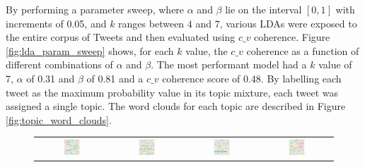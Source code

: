 By performing a parameter sweep, where $\alpha$ and $\beta$ lie on the interval
$[0, 1]$ with increments of 0.05, and $k$ ranges between $4$ and $7$, various
LDAs were exposed to the entire corpus of Tweets and then evaluated using $c\_v$
coherence. Figure \ref{fig:lda_param_sweep} shows, for each $k$ value, the $c\_v$ coherence as a
function of different combinations of $\alpha$ and $\beta$. The most performant
model had a $k$ value of 7, $\alpha$ of 0.31 and $\beta$ of 0.81 and a $c\_v$
coherence score of 0.48. By labelling each tweet as the maximum probability
value in its topic mixture, each tweet was assigned a single topic. The word
clouds for each topic are described in Figure \ref{fig:topic_word_clouds}.

\begin{figure}[h!]
    \centering
    \begin{tabular}{cccc}
    \includegraphics[width=0.25\textwidth]{Figures/topic_1_wordcloud} &
    \includegraphics[width=0.25\textwidth]{Figures/topic_2_wordcloud} &
    \includegraphics[width=0.25\textwidth]{Figures/topic_3_wordcloud} &
    \includegraphics[width=0.25\textwidth]{Figures/topic_4_wordcloud} \\

\end{tabular}
\end{figure}
